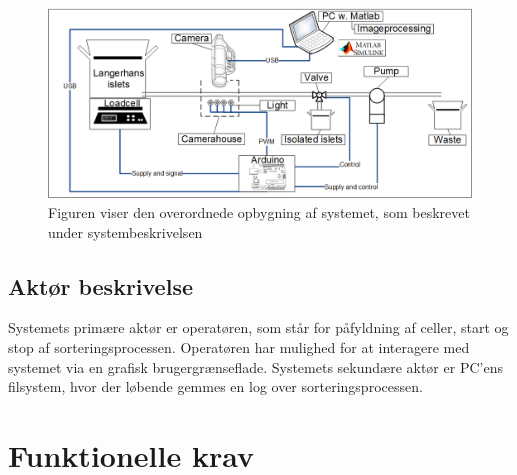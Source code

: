 \begin{figure}[H]
	\centering
	\includegraphics[width=1\textwidth]{billeder/Overview.png}
	\caption{Figuren viser den overordnede opbygning af systemet, som beskrevet under systembeskrivelsen}
	\label{fig:usecase}
\end{figure}

\subsection{Aktør beskrivelse}
Systemets primære aktør er operatøren, som står for påfyldning af celler, start og stop af sorteringsprocessen. Operatøren har mulighed for at interagere med systemet via en grafisk brugergrænseflade. Systemets sekundære aktør er PC’ens filsystem, hvor der løbende gemmes en log over sorteringsprocessen.
\section{Funktionelle krav}

